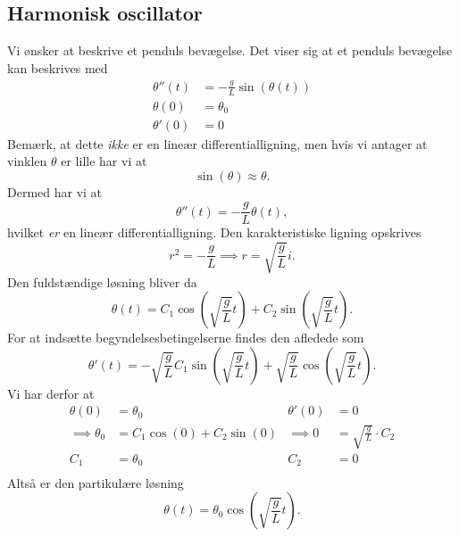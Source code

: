 \subsection{Harmonisk oscillator}
\begin{eks}[Pendul]
  Vi ønsker at beskrive et penduls bevægelse. Det viser sig at et penduls bevægelse kan beskrives med
  \begin{align*}
    \theta''(t) &= -\frac{g}{L}\sin \left( \theta(t) \right) \\
    \theta(0) &= \theta_0 \\
    \theta'(0) &= 0
  \end{align*}
  Bemærk, at dette \textit{ikke} er en lineær differentialligning, men hvis vi antager at vinklen $\theta$ er lille har vi at
  \[
  \sin \left( \theta \right) \approx \theta 
  .\]
  Dermed har vi at
  \[
  \theta''(t) = -\frac{g}{L}\theta(t)
  ,\]
  hvilket \textit{er}  en lineær differentialligning. Den karakteristiske ligning opskrives
  \[
  r^2 = -\frac{g}{L} \implies r = \sqrt{\frac{g}{L}}i
  .\]
  Den fuldstændige løsning bliver da
  \[
  \theta(t) = C_1 \cos \left( \sqrt{\frac{g}{L}} t \right) + C_2 \sin \left( \sqrt{\frac{g}{L}}t  \right)  
  .\]
  For at indsætte begyndelsesbetingelserne findes den afledede som
  \[
  \theta'(t) = -\sqrt{\frac{g}{L}}C_1 \sin \left( \sqrt{\frac{g}{L}}t \right) + \sqrt{\frac{g}{L}} \cos \left( \sqrt{\frac{g}{L}} t \right) 
  .\]
  Vi har derfor at
  \begin{align*}
    \theta (0) &= \theta_0 & \theta'(0) &= 0 \\
    \implies \theta_0 &= C_1 \cos \left( 0 \right) + C_2 \sin \left( 0 \right) & \implies 0 &= \sqrt{\frac{g}{L}}\cdot C_2 \\
    C_1 &= \theta_0 & C_2 &= 0\\ 
  \end{align*}
  Altså er den partikulære løsning
  \[
  \theta (t) = \theta_0 \cos \left( \sqrt{\frac{g}{L}}t \right) 
  .\]
\end{eks}


